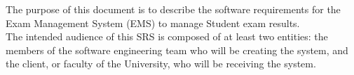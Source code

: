 The purpose of this document is to describe the software requirements for the Exam Management System (EMS) to manage Student exam results.
\\
The intended audience of this SRS is composed of at least two entities: the members of the software engineering team who will be creating the system, and the client, or faculty of the University, who will be receiving the system.
